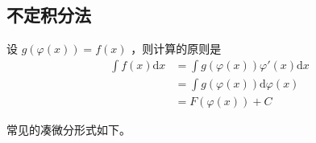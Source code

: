\subsection{不定积分法}

\begin{Field}

    设 $ g(\varphi(x)) = f(x) $ ，则计算的原则是
    \begin{equation*}
        \begin{aligned}
            \int f(x)\mathrm{d}x &= \int g(\varphi(x))\varphi'(x)\mathrm{d}x \\
            &= \int g(\varphi(x))\mathrm{d}\varphi(x) \\ 
            &= F(\varphi(x))+ C
        \end{aligned}
    \end{equation*}
\end{Field}

常见的凑微分形式如下。


